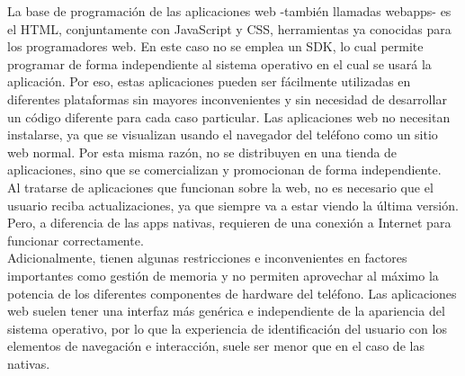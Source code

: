 La base de programación de las aplicaciones web -también llamadas webapps- es el HTML, conjuntamente con JavaScript y CSS, herramientas ya conocidas para los programadores web.
En este caso no se emplea un SDK, lo cual permite programar de forma independiente al sistema operativo en el cual se usará la aplicación. Por eso, estas aplicaciones pueden ser fácilmente utilizadas en diferentes plataformas sin mayores inconvenientes y sin necesidad de desarrollar un código diferente para cada caso particular.
Las aplicaciones web no necesitan instalarse, ya que se visualizan usando el navegador del teléfono como un sitio web normal. Por esta misma razón, no se distribuyen en una tienda de aplicaciones, sino que se comercializan y promocionan de forma independiente.\\
Al tratarse de aplicaciones que funcionan sobre la web, no es necesario que el usuario reciba actualizaciones, ya que siempre va a estar viendo la última versión. Pero, a diferencia de las apps nativas, requieren de una conexión a Internet para funcionar correctamente.\\
Adicionalmente, tienen algunas restricciones e inconvenientes en factores importantes como gestión de memoria y no permiten aprovechar al máximo la potencia de los diferentes componentes de hardware del teléfono.
Las aplicaciones web suelen tener una interfaz más genérica e independiente de la apariencia del sistema operativo, por lo que la experiencia de identificación del usuario con los elementos de navegación e interacción, suele ser menor que en el caso de las nativas.


